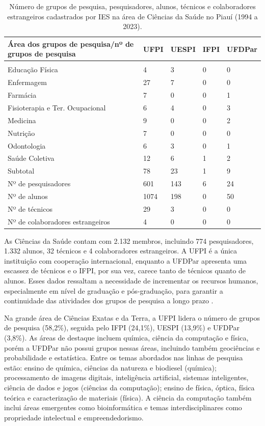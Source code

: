 \documentclass[portuguese]{textolivre}
\begin{document}
\begin{table}[htbp]
\centering
\begin{threeparttable}
\caption{Número de grupos de pesquisa, pesquisadores, alunos, técnicos e colaboradores estrangeiros cadastrados por IES na área de Ciências da Saúde no Piauí (1994 a 2023).}
\label{tbl6}
\begin{tabular}{>{\raggedright\arraybackslash}p{5cm} l l l l}
\toprule
Área dos grupos de pesquisa/nº de grupos de pesquisa & UFPI & UESPI & IFPI & UFDPar \\ 
\midrule
\multicolumn{5}{c}{Ciências da Saúde} \\
\midrule
Educação Física & 4 & 3 & 0 & 0 \\
Enfermagem & 27 & 7 & 0 & 0 \\
Farmácia & 7 & 0 & 0 & 1 \\
Fisioterapia e Ter. Ocupacional & 6 & 4 & 0 & 3 \\
Medicina & 9 & 0 & 0 & 2 \\
Nutrição & 7 & 0 & 0 & 0 \\
Odontologia & 6 & 3 & 0 & 1 \\
Saúde Coletiva & 12 & 6 & 1 & 2 \\
\midrule
Subtotal & 78 & 23 & 1 & 9 \\
\midrule
Nº de pesquisadores & 601 & 143 & 6 & 24 \\
Nº de alunos & 1074 & 198 & 0 & 50 \\
Nº de técnicos & 29 & 3 & 0 & 0 \\
Nº de colaboradores estrangeiros & 4 & 0 & 0 & 0 \\
\bottomrule
\end{tabular}
\end{threeparttable}
\end{table}

As Ciências da Saúde contam com 2.132 membros, incluindo 774 pesquisadores, 1.332 alunos, 32 técnicos e 4 colaboradores estrangeiros. A UFPI é a única instituição com cooperação internacional, enquanto a UFDPar apresenta uma escassez de técnicos e o IFPI, por sua vez, carece tanto de técnicos quanto de alunos. Esses dados ressaltam a necessidade de incrementar os recursos humanos, especialmente em nível de graduação e pós-graduação, para garantir a continuidade das atividades dos grupos de pesquisa a longo prazo \cite{costa2013}.

Na grande área de Ciências Exatas e da Terra, a UFPI lidera o número de grupos de pesquisa (58,2\%), seguida pelo IFPI (24,1\%), UESPI (13,9\%) e UFDPar (3,8\%). As áreas de destaque incluem química, ciência da computação e física, porém a UFDPar não possui grupos nessas áreas, incluindo também geociências e probabilidade e estatística. Entre os temas abordados nas linhas de pesquisa estão: ensino de química, ciências da natureza e biodiesel (química); processamento de imagens digitais, inteligência artificial, sistemas inteligentes, ciência de dados e jogos (ciências da computação); ensino de física, óptica, física teórica e caracterização de materiais (física). A ciência da computação também inclui áreas emergentes como bioinformática e temas interdisciplinares como propriedade intelectual e empreendedorismo.
\end{document}
